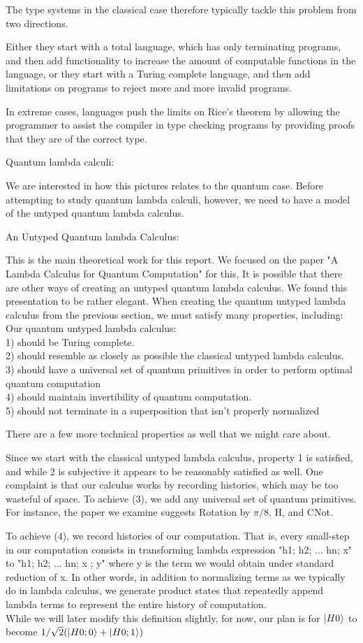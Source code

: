 \documentclass{article}
\theoremstyle{plain}
\theoremstyle{definition}
\theoremstyle{remark}
\begin{document}
The type systems in the classical case therefore typically tackle this problem from two directions.

Either they start with a total language, which has only terminating programs, and then add functionality to increase the amount of computable functions in the language, or they start with a Turing complete language, and then add limitations on programs to reject more and more invalid programs.

In extreme cases, languages push the limits on Rice's theorem by allowing the programmer to assist the compiler in type checking programs by providing proofs that they are of the correct type.

$$$$
{
\Huge Quantum lambda calculi:}
$$$$


We are interested in how this pictures relates to the quantum case.
Before attempting to study quantum lambda calculi, however, we need to have a model of the untyped quantum lambda calculus.

$$$$
{
\large An Untyped Quantum lambda Calculus:}
$$$$

This is the main theoretical work for this report.
We focused on the paper "A Lambda Calculus for Quantum Computation" for this,
It is possible that there are other ways of creating an untyped quantum lambda calculus.
We found this presentation to be rather elegant.
When creating the quantum untyped lambda calculus from the previous section, we must satisfy many properties, including: 
$$$$
Our quantum untyped lambda calculus:
$$$$
1) should be Turing complete.$$$$
2) should resemble as closely as possible the classical untyped lambda calculus.$$$$
3) should have a universal set of quantum primitives in order to perform optimal quantum computation$$$$
4) should maintain invertibility of quantum computation.$$$$
5) should not terminate in a superposition that isn't properly normalized$$$$
$$$$

There are a few more technical properties as well that we might care about.


Since we start with the classical untyped lambda calculus, property 1 is satisfied, and while 2 is subjective it appears to be reasonably satisfied as well. One complaint is that our calculus works by recording histories, which may be too wasteful of space.
To achieve (3), we add any universal set of quantum primitives. For instance, the paper we examine suggests Rotation by $\pi/8$, H, and CNot.

To achieve (4), we record histories of our computation. That is, every small-step in our computation consists in
transforming lambda expression "h1; h2; ... hn; x" to "h1; h2; ... hn; x ; y" where y is the term we would obtain under standard reduction of x.
In other words, in addition to normalizing terms as we typically do in lambda calculus, we generate product states that repeatedly append lambda terms to represent the entire history of computation.
$$$$
While we will later modify this definition slightly, for now, our plan is for $\left|\mspace{0.5mu} H 0 \mspace{0.5mu}\right\rangle$ to become $1/\sqrt{2} (\left|\mspace{0.5mu} H 0; 0 \mspace{0.5mu}\right\rangle + \left|\mspace{0.5mu} H 0; 1 \mspace{0.5mu}\right\rangle)$
$$$$
\end{document}
